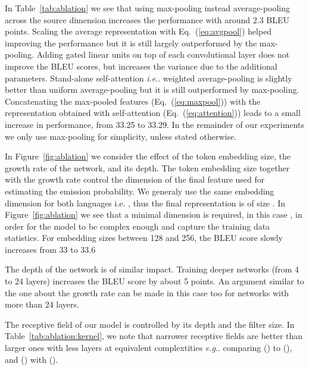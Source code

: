 \documentclass[11pt,a4paper]{article}
\makeatletter
\DeclareRobustCommand\onedot{\futurelet\@let@token\@onedot}
\def\@onedot{\ifx\@let@token.\else.\null\fi\xspace}
\def\eg{\emph{e.g}\onedot} \def\Eg{\emph{E.g}\onedot}
\def\ie{\emph{i.e}\onedot} \def\Ie{\emph{I.e}\onedot}
\def\fig#1{Figure~\ref{fig:#1}}
\def\tab#1{Table~\ref{tab:#1}}
\def\Eq#1{Eq.~(\ref{eq:#1})}
\makeatother
\begin{document}
In \tab{ablation} we see that using max-pooling instead average-pooling across the source dimension increases the performance with around 2.3 BLEU points. 
Scaling the average representation with  \Eq{avgpool} helped improving the performance but it is still largely outperformed by the max-pooling.
Adding gated linear units on top of each convolutional layer does not improve the BLEU scores, but increases the variance due to the additional parameters. 
Stand-alone self-attention \ie weighted average-pooling is slightly better than uniform average-pooling but it is still outperformed by max-pooling. 
Concatenating the max-pooled features (\Eq{maxpool}) with the representation obtained with self-attention (\Eq{attention}) leads to a small increase in performance, from 33.25 to 33.29. In the remainder of our experiments we only use max-pooling for simplicity, unless stated otherwise. 

In \fig{ablation} we consider the effect of the token embedding size, the growth rate of the network, and its depth. 
The token embedding size together with the growth rate  control the dimension of the final feature used for estimating the emission probability. We generaly use the same embedding dimension for both languages i.e. , thus the final representation is of size .
In \fig{ablation} we see that a minimal dimension is required, in this case , in order for the model to be complex enough and capture the training data statistics.
For embedding sizes between 128 and 256, the BLEU score slowly increases from 33 to 33.6


The depth of the network is of similar impact. Training deeper networks (from 4 to 24 layers)  increases the BLEU score by about 5 points.
An argument similar to the one about the growth rate can be made in this case too for networks with more than 24 layers.

The receptive field of our model is controlled by its depth and the filter size. In \tab{ablation:kernel}, we note that
narrower receptive fields are better than larger ones with less layers at equivalent complextities \eg comparing () to (), and () with ().
\end{document}
